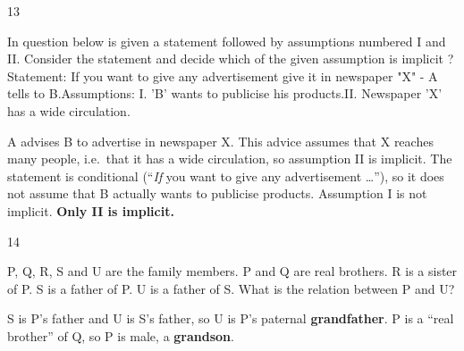 \begin{question}{13}
{In question below is given a statement followed by assumptions numbered I and II. Consider the statement and decide which of the given assumption is implicit ?\newline Statement: If you want to give any advertisement give it in newspaper "X" - A tells to B.\newline Assumptions: \newline I. 'B' wants to publicise his products.\newline II. Newspaper 'X' has a wide circulation.\par}
\begin{explain}
A advises B to advertise in newspaper X. This advice assumes that X reaches many people, i.e.\ that it has a wide circulation, so assumption II is implicit. The statement is conditional (``\emph{If} you want to give any advertisement \ldots''), so it does not assume that B actually wants to publicise products. Assumption I is not implicit.
\textbf{Only II is implicit.}
\end{explain}
\end{question}

\begin{question}{14}
{P, Q, R, S and U are the family members. P and Q are real brothers. R is a sister of P. S is a father of P. U is a father of S. What is the relation between P and U?\par}
\begin{explain}
S is P's father and U is S's father, so U is P's paternal \textbf{grandfather}. P is a ``real brother'' of Q, so P is male, a \textbf{grandson}.
\begin{center}
\end{center}
\end{explain}
\end{question}

